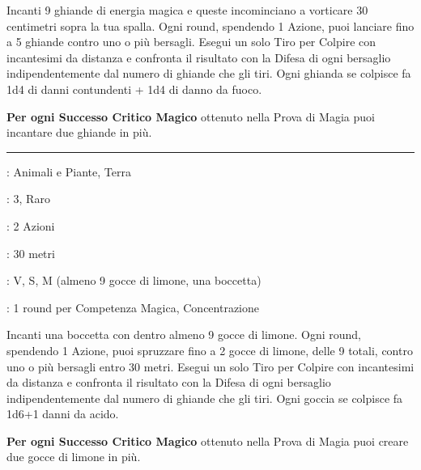 \begin{multicols}{2}
Incanti 9 ghiande di energia magica e queste incominciano a vorticare 30 centimetri sopra la tua spalla.
Ogni round, spendendo 1 Azione, puoi lanciare fino a 5 ghiande contro uno o più bersagli.
Esegui un solo Tiro per Colpire con incantesimi da distanza e confronta il risultato con la Difesa di ogni bersaglio indipendentemente dal numero di ghiande che gli tiri. Ogni ghianda se colpisce fa 1d4 di danni contundenti + 1d4 di danno da fuoco.

\textbf{Per ogni Successo Critico Magico} ottenuto nella Prova di Magia puoi incantare due ghiande in più.

\smallskip\noindent\rule{\linewidth}{2pt} \hypertarget{Gragnola di Limoni di Kyrin}{}\medskip{}
\noindent
\begin{description}[noitemsep, topsep=0pt, parsep=0pt, partopsep=0pt, leftmargin=0cm, labelwidth=2.8cm]
	\item[\textbf{Lista di Magia}]: Animali e Piante, Terra
	\item[\textbf{Livello}]: 3, Raro
	\item[\textbf{T. di Lancio}]: 2 Azioni
	\item[\textbf{Gittata}]: 30 metri
	\item[\textbf{Componenti}]: V, S, M (almeno 9 gocce di limone, una boccetta)
	\item[\textbf{Durata}]: 1 round per Competenza Magica, Concentrazione
\end{description}

Incanti una boccetta con dentro almeno 9 gocce di limone.
Ogni round, spendendo 1 Azione, puoi spruzzare fino a 2 gocce di limone, delle 9 totali, contro uno o più bersagli entro 30 metri.
Esegui un solo Tiro per Colpire con incantesimi da distanza e confronta il risultato con la Difesa di ogni bersaglio indipendentemente dal numero di ghiande che gli tiri. Ogni goccia se colpisce fa 1d6+1 danni da acido.

\textbf{Per ogni Successo Critico Magico} ottenuto nella Prova di Magia puoi creare due gocce di limone in più.


\end{multicols}
